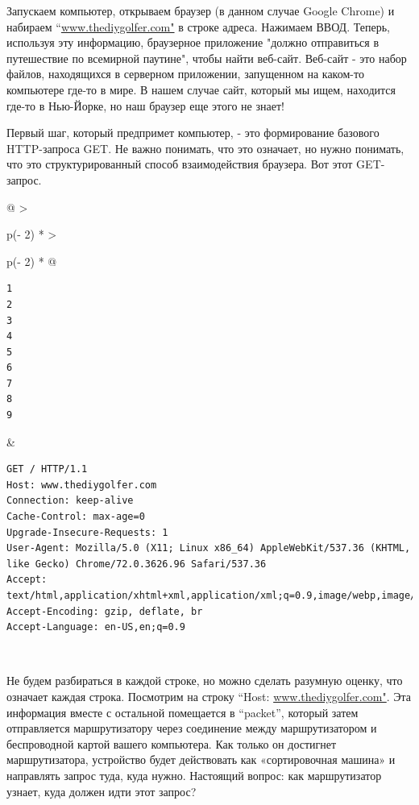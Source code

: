 \documentclass{report}
\begin{document}
Запускаем компьютер, открываем браузер (в данном случае Google Chrome) и
набираем ``\href{http://www.thediygolfer.com}{www.thediygolfer.com"} в
строке адреса. Нажимаем ВВОД. Теперь, используя эту информацию,
браузерное приложение "должно отправиться в путешествие по всемирной
паутине", чтобы найти веб-сайт. Веб-сайт - это набор файлов, находящихся
в серверном приложении, запущенном на каком-то компьютере где-то в мире.
В нашем случае сайт, который мы ищем, находится где-то в Нью-Йорке, но
наш браузер еще этого не знает!

Первый шаг, который предпримет компьютер, - это формирование базового
HTTP-запроса GET. Не важно понимать, что это означает, но нужно
понимать, что это структурированный способ взаимодействия браузера. Вот
этот GET-запрос.

\begin{longtable}[]{@{}
  >{\raggedright\arraybackslash}p{(\columnwidth - 2\tabcolsep) * }
  >{\raggedright\arraybackslash}p{(\columnwidth - 2\tabcolsep) * }@{}}
\toprule
\endhead
\begin{minipage}[t]{\linewidth}\raggedright
\begin{verbatim}
1
2
3
4
5
6
7
8
9
\end{verbatim}
\end{minipage} & \begin{minipage}[t]{\linewidth}\raggedright
\begin{verbatim}
GET / HTTP/1.1
Host: www.thediygolfer.com
Connection: keep-alive
Cache-Control: max-age=0
Upgrade-Insecure-Requests: 1
User-Agent: Mozilla/5.0 (X11; Linux x86_64) AppleWebKit/537.36 (KHTML, like Gecko) Chrome/72.0.3626.96 Safari/537.36
Accept: text/html,application/xhtml+xml,application/xml;q=0.9,image/webp,image/apng,*/*;q=0.8
Accept-Encoding: gzip, deflate, br
Accept-Language: en-US,en;q=0.9
\end{verbatim}
\end{minipage} \\ \addlinespace
\bottomrule
\end{longtable}

Не будем разбираться в каждой строке, но можно сделать разумную оценку,
что означает каждая строка. Посмотрим на строку ``Host:
\href{http://www.thediygolfer.com}{www.thediygolfer.com"}. Эта
информация вместе с остальной помещается в ``packet'', который затем
отправляется маршрутизатору через соединение между маршрутизатором и
беспроводной картой вашего компьютера. Как только он достигнет
маршрутизатора, устройство будет действовать как «сортировочная машина»
и направлять запрос туда, куда нужно. Настоящий вопрос: как
маршрутизатор узнает, куда должен идти этот запрос?
\end{document}
